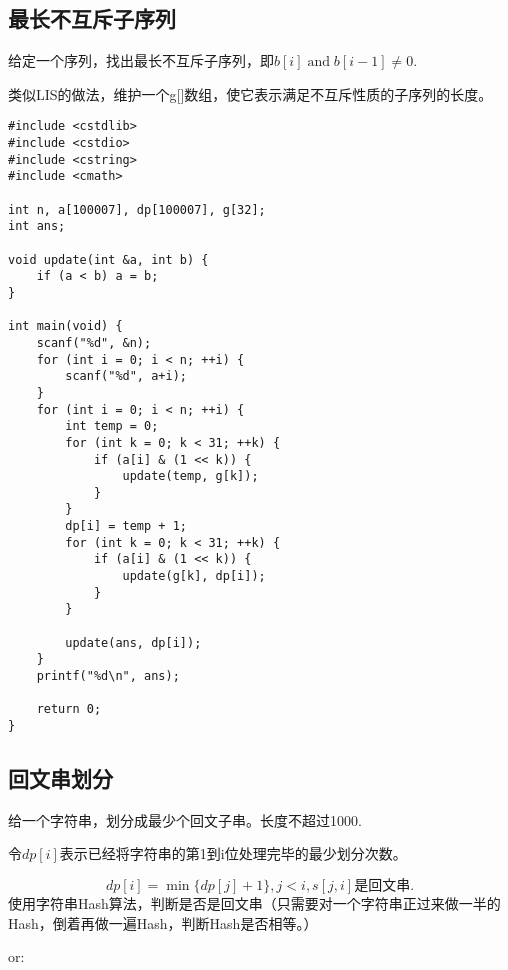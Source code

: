 \documentclass{article}
\DeclareMathOperator{\band}{and}
\begin{document}
\subsection{最长不互斥子序列}
给定一个序列，找出最长不互斥子序列，即$b[i]\band b[i-1]\neq 0.$

类似LIS的做法，维护一个g[]数组，使它表示满足不互斥性质的子序列的长度。
\begin{verbatim}
#include <cstdlib>
#include <cstdio>
#include <cstring>
#include <cmath>

int n, a[100007], dp[100007], g[32];
int ans;

void update(int &a, int b) {
    if (a < b) a = b;
}

int main(void) {
    scanf("%d", &n);
    for (int i = 0; i < n; ++i) {
        scanf("%d", a+i);
    }
    for (int i = 0; i < n; ++i) {
        int temp = 0;
        for (int k = 0; k < 31; ++k) {
            if (a[i] & (1 << k)) {
                update(temp, g[k]);
            }
        }
        dp[i] = temp + 1;
        for (int k = 0; k < 31; ++k) {
            if (a[i] & (1 << k)) {
                update(g[k], dp[i]);
            }
        }

        update(ans, dp[i]);
    }
    printf("%d\n", ans);

    return 0;
}
\end{verbatim}
\subsection{回文串划分}
给一个字符串，划分成最少个回文子串。长度不超过1000.

令$dp[i]$表示已经将字符串的第1到i位处理完毕的最少划分次数。

$$dp[i]=\min\{dp[j]+1\},j<i,s[j,i]是回文串.$$
使用字符串Hash算法，判断是否是回文串（只需要对一个字符串正过来做一半的Hash，倒着再做一遍Hash，判断Hash是否相等。）

or:
\end{document}
